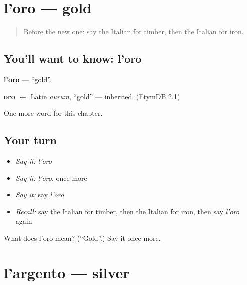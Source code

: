 \section[l'oro]{l'oro — gold}

\label{lesson:IT-C201-oro}



\begin{quote}
Before the new one: say the Italian for timber, then the Italian for iron.
\end{quote}

\subsection*{You'll want to know: l'oro}
\textbf{l'oro} — \textquotedblleft{}gold\textquotedblright{}.

\begin{cousinweb}
\textbf{oro} $\leftarrow$ Latin \emph{aurum}, \textquotedblleft{}gold\textquotedblright{} — inherited. (EtymDB 2.1)
\end{cousinweb}

\begin{grammarlens}[title={What you've built}]
One more word for this chapter.
\end{grammarlens}

\subsection*{Your turn}
\begin{itemize}
\raggedright
  \item \emph{Say it:} \emph{l'oro}
  \item \emph{Say it:} \emph{l'oro}, once more
  \item \emph{Say it:} say \emph{l'oro}
  \item \emph{Recall:} say the Italian for timber, then the Italian for iron, then say \emph{l'oro} again
\end{itemize}

\begin{tcolorbox}[breakable,colback=teal!4,colframe=teal!35!black,title={Before you move on}]
What does l'oro mean? (\textquotedblleft{}Gold\textquotedblright{}.) Say it once more.
\end{tcolorbox}
\section[l'argento]{l'argento — silver}

